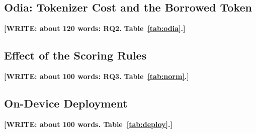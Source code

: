 \documentclass[conference]{IEEEtran}
\newcommand{\WRITE}[1]{{\color{red}\textbf{[WRITE: #1]}}}
\begin{document}


\subsection{Odia: Tokenizer Cost and the Borrowed Token}

\WRITE{about 120 words: RQ2. Table~\ref{tab:odia}.}



\subsection{Effect of the Scoring Rules}

\WRITE{about 100 words: RQ3. Table~\ref{tab:norm}.}



\subsection{On-Device Deployment}

\WRITE{about 100 words. Table~\ref{tab:deploy}.}
\end{document}
